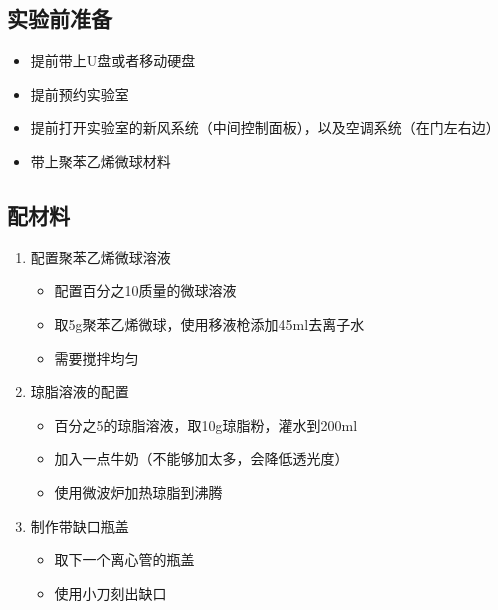 \documentclass[12pt]{article}
\begin{document}
\subsection{实验前准备}
\begin{itemize}
    \item 提前带上U盘或者移动硬盘
    \item 提前预约实验室
    \item 提前打开实验室的新风系统（中间控制面板），以及空调系统（在门左右边）
    \item 带上聚苯乙烯微球材料
\end{itemize}

\subsection{配材料}
\begin{enumerate}
    \item 配置聚苯乙烯微球溶液
    \begin{itemize}
        \item 配置百分之10质量的微球溶液
        \item 取5g聚苯乙烯微球，使用移液枪添加45ml去离子水
        \item 需要搅拌均匀
    \end{itemize}

    \item 琼脂溶液的配置
    \begin{itemize}
        \item 百分之5的琼脂溶液，取10g琼脂粉，灌水到200ml
        \item 加入一点牛奶（不能够加太多，会降低透光度）
        \item 使用微波炉加热琼脂到沸腾
    \end{itemize}

    \item 制作带缺口瓶盖
    \begin{itemize}
        \item 取下一个离心管的瓶盖
        \item 使用小刀刻出缺口
    \end{itemize}
\end{enumerate}
\end{document}
